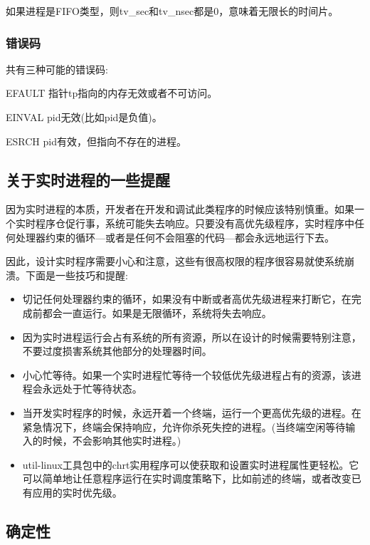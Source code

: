   如果进程是FIFO类型，则tv\_sec和tv\_nsec都是0，意味着无限长的时间片。

\subsubsection{错误码}

  共有三种可能的错误码:

\begin{eqlist*}
\item[EFAULT] 指针tp指向的内存无效或者不可访问。
\item[EINVAL] pid无效(比如pid是负值)。
\item[ESRCH] pid有效，但指向不存在的进程。
\end{eqlist*}

\subsection{关于实时进程的一些提醒}

  因为实时进程的本质，开发者在开发和调试此类程序的时候应该特别慎重。如果一个实时程序仓促行事，系统可能失去响应。只要没有高优先级程序，实时程序中任何处理器约束的循环---或者是任何不会阻塞的代码---都会永远地运行下去。

  因此，设计实时程序需要小心和注意，这些有很高权限的程序很容易就使系统崩溃。下面是一些技巧和提醒:

\begin{itemize}
\item 切记任何处理器约束的循环，如果没有中断或者高优先级进程来打断它，在完成前都会一直运行。如果是无限循环，系统将失去响应。
\item 因为实时进程运行会占有系统的所有资源，所以在设计的时候需要特别注意，不要过度损害系统其他部分的处理器时间。
\item 小心忙等待。如果一个实时进程忙等待一个较低优先级进程占有的资源，该进程会永远处于忙等待状态。
\item 当开发实时程序的时候，永远开着一个终端，运行一个更高优先级的进程。在紧急情况下，终端会保持响应，允许你杀死失控的进程。(当终端空闲等待输入的时候，不会影响其他实时进程。)
\item util-linux工具包中的chrt实用程序可以使获取和设置实时进程属性更轻松。它可以简单地让任意程序运行在实时调度策略下，比如前述的终端，或者改变已有应用的实时优先级。
\end{itemize}

\subsection{确定性}

